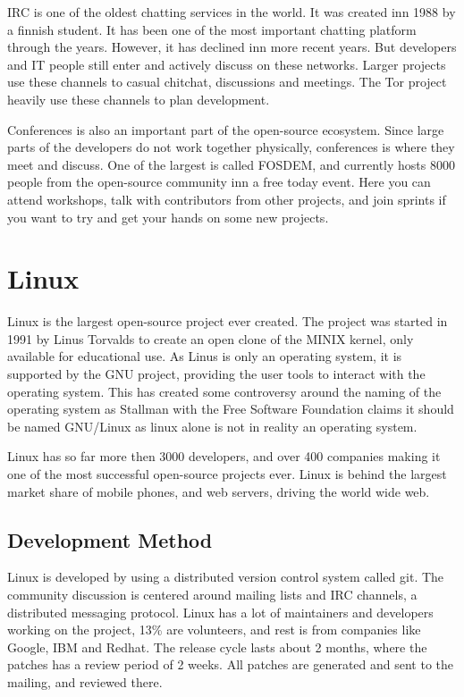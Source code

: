 \documentclass[12pt]{article}
\begin{document}
IRC is one of the oldest chatting services in the world. It was created inn 1988
by a finnish student. It has been one of the most important chatting platform
through the years. However, it has declined inn more recent years. But
developers and IT people still enter and actively discuss on these
networks\cite{irc}.  Larger projects use these channels to casual chitchat,
discussions and meetings.  The Tor project heavily use these channels to plan
development.

Conferences is also an important part of the open-source ecosystem. Since large
parts of the developers do not work together physically, conferences is where
they meet and discuss. One of the largest is called FOSDEM\cite{fosdem}, and currently
hosts 8000 people from the open-source community inn a free today event. Here
you can attend workshops, talk with contributors from other projects, and join
sprints if you want to try and get your hands on some new projects.

\section{Linux}
Linux is the largest open-source project ever created. The project was started
in 1991 by Linus Torvalds to create an open clone of the MINIX kernel, only
available for educational use\cite{history-of-linux}. As Linus is only an
operating system, it is supported by the GNU project, providing the user tools
to interact with the operating system. This has created some controversy around
the naming of the operating system as Stallman with the Free Software Foundation
claims it should be named GNU/Linux as linux alone is not in reality an
operating system.

Linux has so far more then 3000 developers, and over 400 companies making it one
of the most successful open-source projects ever. Linux is behind the largest
market share of mobile phones, and web servers, driving the world wide
web.


\subsection{Development Method}
Linux is developed by using a distributed version control system called git. The
community discussion is centered around mailing lists and IRC channels, a
distributed messaging protocol. Linux has a lot of maintainers and developers
working on the project, 13\% are volunteers, and rest is from companies like
Google, IBM and Redhat. The release cycle lasts about 2 months, where the
patches has a review period of 2 weeks. All patches are generated and sent to
the mailing, and reviewed there\cite{linux-maintainer}.
\end{document}
